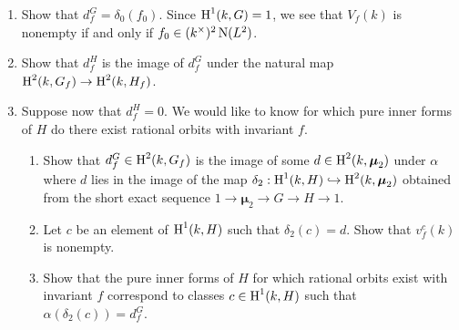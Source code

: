 \begin{exercise}
\begin{enumerate}
  \item Show that $d_f^G=\delta_0(f_0)$. Since $\operatorname{H}^1(k,G)=1$, we see that 
    $V_f(k)$ is nonempty if and only if $f_0\in (k^\times)^2 \operatorname{N}(L^2)$. 
  \item Show that $d_f^H$ is the image of $d_f^G$ under the natural map 
    $\operatorname{H}^2(k,G_f) \to \operatorname{H}^2(k,H_f)$. 
  \item Suppose now that $d_f^H=0$. We would like to know for which pure inner 
    forms of $H$ do there exist rational orbits with invariant $f$. 
     \begin{enumerate}
       \item Show that $d_f^G\in \operatorname{H}^2(k,G_f)$ is the image of some 
         $d\in \operatorname{H}^2(k,\boldsymbol\mu_2)$ under $\alpha$ where $d$ lies in the 
         image of the map $\delta_2:\operatorname{H}^1(k,H) \hookrightarrow \operatorname{H}^2(k,\boldsymbol\mu_2)$ 
         obtained from the short exact sequence $1\to \boldsymbol\mu_2 \to G\to H\to 1$. 
       \item Let $c$ be an element of $\operatorname{H}^1(k,H)$ such that $\delta_2(c)=d$. 
         Show that $v_f^c(k)$ is nonempty. 
       \item Show that the pure inner forms of $H$ for which rational orbits 
         exist with invariant $f$ correspond to classes $c\in \operatorname{H}^1(k,H)$ such 
         that $\alpha(\delta_2(c))=d_f^G$. 
     \end{enumerate}
\end{enumerate}
\end{exercise}




